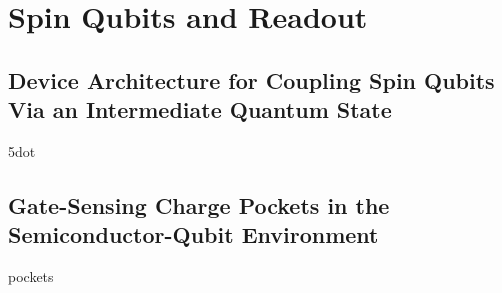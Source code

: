 \chapter{Spin Qubits and Readout}
\label{sec:spinqubit}

\clearpage
\section{Device Architecture for Coupling Spin Qubits Via an Intermediate Quantum State}
\label{sec:5dot}
{5dot}

\clearpage
\section{Gate-Sensing Charge Pockets in the Semiconductor-Qubit Environment}
\label{sec:pockets}
{pockets}